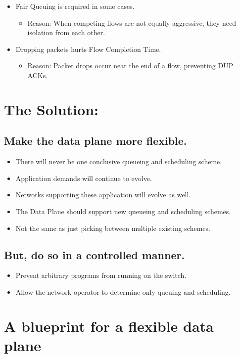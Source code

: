 {\begin{multicols}{2}
\begin{itemize}
\item Fair Queuing is required in some cases.
      \begin{itemize}      
      \item Reason: When competing flows are not equally aggressive, they need isolation from each other.
      \end{itemize}

\item Dropping packets hurts Flow Completion Time.
      \begin{itemize}
      \item Reason: Packet drops occur near the end of a flow, preventing DUP ACKs.
      \end{itemize}

\end{itemize}

%
\section*{The Solution:}
\subsection*{Make the data plane more flexible.}
\begin{itemize}
\item There will never be one conclusive queueing and scheduling scheme.
\item Application demands will continue to evolve.
\item Networks supporting these application will evolve as well.
\item The Data Plane should support new queueing and scheduling schemes.
\item Not the same as just picking between multiple existing schemes.
\end{itemize}

\subsection*{But, do so in a controlled manner.}
\begin{itemize}
\item Prevent arbitrary programs from running on the switch.
\item Allow the network operator to determine only queuing and scheduling.
\end{itemize}

\section*{A blueprint for a flexible data plane}


\end{multicols}}
